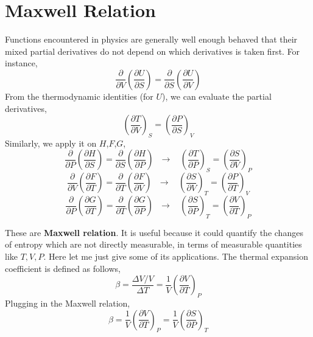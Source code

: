 \section{Maxwell Relation}
Functions encountered in physics are generally well enough behaved that their
mixed partial derivatives do not depend on which derivatives is taken first. For instance,
\begin{equation} 
                 \frac {\partial}{\partial V} (\frac{\partial U}{\partial S}) 
               = \frac {\partial}{\partial S} (\frac{\partial U}{\partial V})
\end{equation}
From the thermodynamic identities (for $U$), we can evaluate the partial derivatives,
\begin{equation} 
               (\frac{\partial T}{\partial V})_S
               = (\frac{\partial P}{\partial S})_V
\end{equation}
Similarly, we apply it on $H$,$F$,$G$,
\begin{equation} \frac {\partial}{\partial P} (\frac{\partial H}{\partial S}) 
               = \frac {\partial}{\partial S} (\frac{\partial H}{\partial P})
               ~~~ \rightarrow ~~~~
                (\frac{\partial T}{\partial P})_S
               = (\frac{\partial S}{\partial V})_P
\end{equation}
\begin{equation} \frac {\partial}{\partial V} (\frac{\partial F}{\partial T}) 
               = \frac {\partial}{\partial T} (\frac{\partial F}{\partial V})
               ~~~ \rightarrow ~~~~
                (\frac{\partial S}{\partial V})_T
               = (\frac{\partial P}{\partial T})_V
\end{equation}
\begin{equation} \frac {\partial}{\partial P} (\frac{\partial G}{\partial T}) 
               = \frac {\partial}{\partial T} (\frac{\partial G}{\partial P})
               ~~~ \rightarrow ~~~~
                (\frac{\partial S}{\partial P})_T
               = (\frac{\partial V}{\partial T})_P
\end{equation}

These are {\bf Maxwell relation}. It is useful because it could quantify the changes of 
entropy which are not directly measurable, in terms of measurable quantities like $T,V,P$.
Here let me just give some of its applications.
The thermal expansion coefficient is defined as follows,
\begin{equation}
\beta = \frac{\Delta{V}/V}{\Delta{T}} = \frac{1}{V}(\frac{\partial V}{\partial T})_P
\end{equation}
Plugging in the Maxwell relation,
\begin{equation}
\beta = \frac{1}{V}(\frac{\partial V}{\partial T})_P 
      = \frac{1}{V}(\frac{\partial S}{\partial P})_T 
\end{equation}

